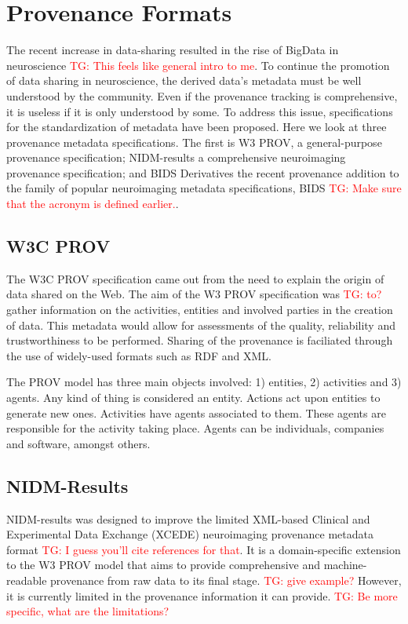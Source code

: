 \documentclass{report}
\newcommand{\tristan}[1]{\textcolor{red}{TG: #1}}
\begin{document}
        \section{Provenance Formats}\label{metadata}
            The recent increase in data-sharing resulted in the rise of BigData 
            in neuroscience \tristan{This feels like general intro to me}. To continue the promotion of data sharing in 
            neuroscience, the derived data's metadata must be well understood
            by the community. Even if the provenance tracking is comprehensive,
            it is useless if it is only understood by some. To address this 
            issue, specifications for the standardization of metadata have been 
            proposed. Here we look at three provenance metadata specifications.
            The first is W3 PROV, a general-purpose provenance specification; 
            NIDM-results
            a comprehensive neuroimaging provenance specification; and BIDS 
            Derivatives the recent provenance addition to the family of 
            popular neuroimaging metadata specifications, BIDS \tristan{Make sure that
            the acronym is defined earlier.}.

            \subsection{W3C PROV}
            The W3C PROV specification came out from the need to explain the 
            origin of data shared on the Web. 
            The aim of the W3 PROV specification was \tristan{to?} gather information on
            the activities, entities and involved parties in the creation of 
            data. This metadata would allow for assessments of the quality, 
            reliability and trustworthiness to be performed. Sharing of the 
            provenance is faciliated through the use of widely-used formats 
            such as RDF and XML. 

            The PROV model has three main objects involved: 1) entities, 2) 
            activities and 3) agents. Any kind of thing is considered an entity.
            Actions act upon entities to generate new ones. Activities have 
            agents associated to them. These agents are responsible for the 
            activity taking place. Agents can be individuals, companies and 
            software, amongst others.
            
            \subsection{NIDM-Results}
                NIDM-results was designed to improve the limited XML-based 
                Clinical and Experimental Data Exchange (XCEDE) neuroimaging
                provenance metadata format \tristan{I guess you'll cite references for that}. It is a domain-specific extension
                to the W3 PROV model that aims to provide comprehensive and
                machine-readable provenance from raw data to its final stage. \tristan{give example?}
                However, it is currently limited in the provenance 
                information it can provide. \tristan{Be more specific, what are the limitations?}
\end{document}
